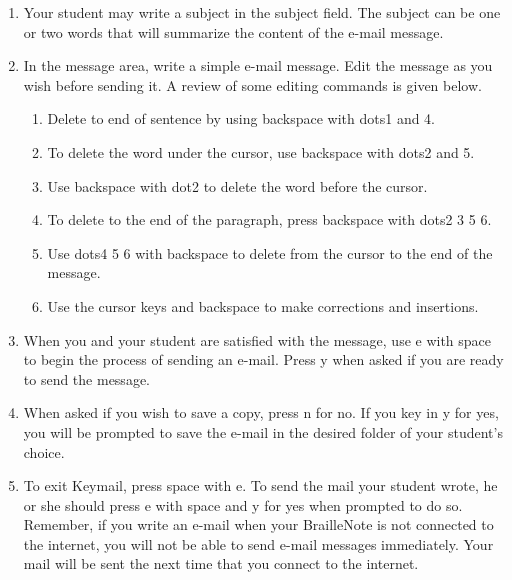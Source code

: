 \documentclass[10pt,letterpaper,twoside]{report}
\begin{document}
{{{{\begin{enumerate}
	\item Your student may write a subject in the subject field.  The subject can be one or two words that will summarize the content of the e-mail message.
	      
	\item In the message area, write a simple e-mail message.  Edit the message as you wish before sending it.  A review of some editing commands is given below.
	      
	      \begin{enumerate}
		      \item Delete to end of sentence by using backspace with dots1 and 4.
		            
		      \item To delete the word under the cursor, use backspace with dots2 and 5.
		            
		      \item Use backspace with dot2 to delete the word before the cursor.
		            
		      \item To delete to the end of the paragraph, press backspace with dots2 3 5 6.
		            
		      \item Use dots4 5 6 with backspace to delete from the cursor to the end of the message.
		            
		      \item Use the cursor keys and backspace to make corrections and insertions.
		            
		            
	      \end{enumerate}
	\item When you and your student are satisfied with the message, use e with space to begin the process of sending an e-mail.  Press y when asked if you are ready to send the message.
	      
	\item When asked if you wish to save a copy, press n for no.  If you key in y for yes, you will be prompted to save the e-mail in the desired folder of your student's choice.
	      
	\item To exit Keymail, press space with e.  To send the mail your student wrote, he or she should press e with space and y for yes when prompted to do so.  Remember, if you write an e-mail when your BrailleNote is not connected to the internet, you will not be able to send e-mail messages immediately.  Your mail will be sent the next time that you connect to the internet.
	      

\end{enumerate}}}}}
\end{document}
